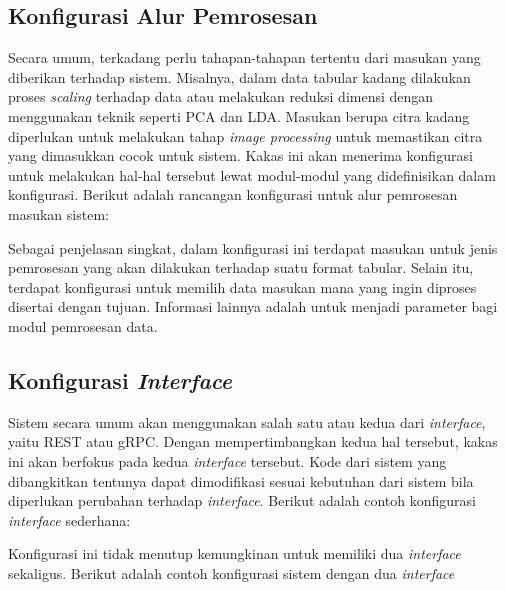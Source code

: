 
\subsection{Konfigurasi Alur Pemrosesan}\label{section:03-processing-pipeline}
Secara umum, terkadang perlu tahapan-tahapan tertentu dari masukan yang diberikan terhadap sistem.
Misalnya, dalam data tabular kadang dilakukan proses \textit{scaling} terhadap data atau melakukan reduksi dimensi dengan menggunakan teknik seperti PCA dan LDA.
Masukan berupa citra kadang diperlukan untuk melakukan tahap \textit{image processing} untuk memastikan citra yang dimasukkan cocok untuk sistem.
Kakas ini akan menerima konfigurasi untuk melakukan hal-hal tersebut lewat modul-modul yang didefinisikan dalam konfigurasi.
Berikut adalah rancangan konfigurasi untuk alur pemrosesan masukan sistem:


Sebagai penjelasan singkat, dalam konfigurasi ini terdapat masukan untuk jenis pemrosesan yang akan dilakukan terhadap suatu format tabular.
Selain itu, terdapat konfigurasi untuk memilih data masukan mana yang ingin diproses disertai dengan tujuan.
Informasi lainnya adalah untuk menjadi parameter bagi modul pemrosesan data. 

\subsection{Konfigurasi \textit{Interface}}\label{section:03-interface-config}
Sistem secara umum akan menggunakan salah satu atau kedua dari \textit{interface}, yaitu REST atau gRPC.
Dengan mempertimbangkan kedua hal tersebut, kakas ini akan berfokus pada kedua \textit{interface} tersebut.
Kode dari sistem yang dibangkitkan tentunya dapat dimodifikasi sesuai kebutuhan dari sistem bila diperlukan perubahan terhadap \textit{interface}.
Berikut adalah contoh konfigurasi \textit{interface} sederhana:


Konfigurasi ini tidak menutup kemungkinan untuk memiliki dua \textit{interface} sekaligus.
Berikut adalah contoh konfigurasi sistem dengan dua \textit{interface}

